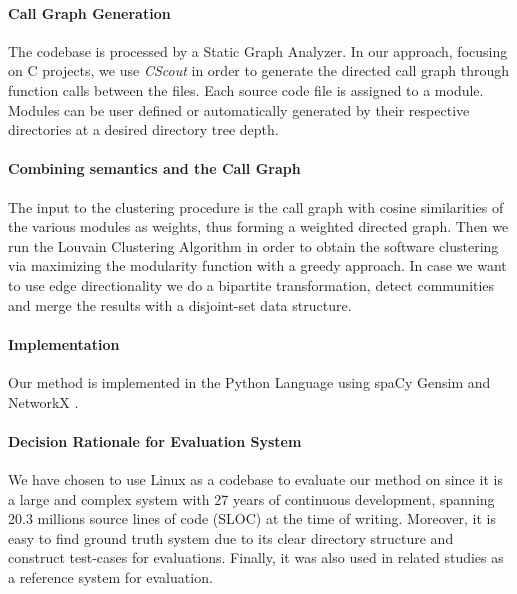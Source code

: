 \documentclass[sigconf,review, anonymous]{acmart}
\begin{document}
\paragraph{Call Graph Generation} 
The codebase is processed by a Static Graph Analyzer. 
In our approach, focusing on C projects, we use \emph{CScout} \cite{cscout} in order to generate the directed call graph through function calls between the files. 
Each source code file is assigned to a module. 
Modules can be user defined or automatically generated by their respective directories at a desired directory tree depth. 

\paragraph{Combining semantics and the Call Graph} 
The input to the clustering procedure
is the call graph with cosine similarities of the various modules as weights, thus forming a
weighted directed graph. Then we run the Louvain Clustering Algorithm \cite{louvain} in
order to obtain the software clustering via maximizing the modularity function with a greedy approach. 
In case we want to use edge directionality we do a bipartite transformation, detect communities and
merge the results with a disjoint-set data structure.
    

\paragraph{Implementation}  
Our method is implemented in the Python Language using spaCy\cite{spacy} Gensim \cite{gensim} and NetworkX \cite{nx}.

\paragraph{Decision Rationale for Evaluation System} 
We have chosen to use Linux as a codebase to evaluate our method on 
since it is a large and complex system with 27 years of continuous development, spanning 20.3 millions source lines of code (SLOC) at the time of writing.  
Moreover, it is easy to find ground truth system due to its clear directory structure and construct test-cases for
evaluations. 
Finally, it was also used in related studies \cite{acdc, evaluation} as a reference system for evaluation. 
\end{document}
